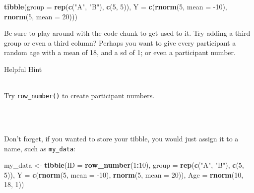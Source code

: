 \documentclass[]{book}
\newenvironment{Shaded}{\begin{snugshade}}{\end{snugshade}}
\newcommand{\DataTypeTok}[1]{\textcolor[rgb]{0.13,0.29,0.53}{#1}}
\newcommand{\DecValTok}[1]{\textcolor[rgb]{0.00,0.00,0.81}{#1}}
\newcommand{\KeywordTok}[1]{\textcolor[rgb]{0.13,0.29,0.53}{\textbf{#1}}}
\newcommand{\NormalTok}[1]{#1}
\newcommand{\OperatorTok}[1]{\textcolor[rgb]{0.81,0.36,0.00}{\textbf{#1}}}
\newcommand{\StringTok}[1]{\textcolor[rgb]{0.31,0.60,0.02}{#1}}
\newenvironment{info}
    {
    \hline\\
    }
    { 
    \\\\\hline
    }
\begin{document}
\begin{Shaded}
\begin{Highlighting}[]
\KeywordTok{tibble}\NormalTok{(}\DataTypeTok{group =} \KeywordTok{rep}\NormalTok{(}\KeywordTok{c}\NormalTok{(}\StringTok{"A"}\NormalTok{, }\StringTok{"B"}\NormalTok{), }\KeywordTok{c}\NormalTok{(}\DecValTok{5}\NormalTok{, }\DecValTok{5}\NormalTok{)),}
       \DataTypeTok{Y =} \KeywordTok{c}\NormalTok{(}\KeywordTok{rnorm}\NormalTok{(}\DecValTok{5}\NormalTok{, }\DataTypeTok{mean =} \DecValTok{-10}\NormalTok{), }\KeywordTok{rnorm}\NormalTok{(}\DecValTok{5}\NormalTok{, }\DataTypeTok{mean =}  \DecValTok{20}\NormalTok{)))}
\end{Highlighting}
\end{Shaded}

Be sure to play around with the code chunk to get used to it. Try adding a third group or even a third column? Perhaps you want to give every participant a random age with a mean of 18, and a sd of 1; or even a participant number.

Helpful Hint

\begin{info}
Try \texttt{row\_number()} to create participant numbers.
\end{info}

Don't forget, if you wanted to store your tibble, you would just assign it to a name, such as \texttt{my\_data}:

\begin{Shaded}
\begin{Highlighting}[]
\NormalTok{my_data <-}\StringTok{ }\KeywordTok{tibble}\NormalTok{(}\DataTypeTok{ID =} \KeywordTok{row_number}\NormalTok{(}\DecValTok{1}\OperatorTok{:}\DecValTok{10}\NormalTok{), }
                    \DataTypeTok{group =} \KeywordTok{rep}\NormalTok{(}\KeywordTok{c}\NormalTok{(}\StringTok{"A"}\NormalTok{, }\StringTok{"B"}\NormalTok{), }\KeywordTok{c}\NormalTok{(}\DecValTok{5}\NormalTok{, }\DecValTok{5}\NormalTok{)),}
                    \DataTypeTok{Y =} \KeywordTok{c}\NormalTok{(}\KeywordTok{rnorm}\NormalTok{(}\DecValTok{5}\NormalTok{, }\DataTypeTok{mean =} \DecValTok{-10}\NormalTok{), }\KeywordTok{rnorm}\NormalTok{(}\DecValTok{5}\NormalTok{, }\DataTypeTok{mean =}  \DecValTok{20}\NormalTok{)),}
                    \DataTypeTok{Age =} \KeywordTok{rnorm}\NormalTok{(}\DecValTok{10}\NormalTok{, }\DecValTok{18}\NormalTok{, }\DecValTok{1}\NormalTok{))}
\end{Highlighting}
\end{Shaded}
\end{document}
